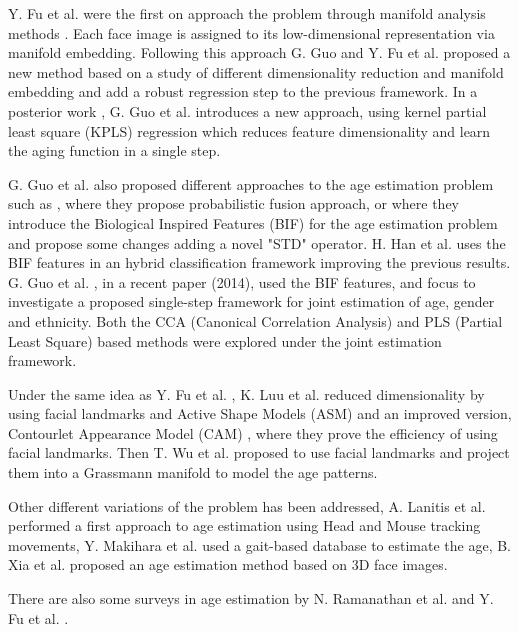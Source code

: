 Y. Fu et al. were the first on approach the problem through manifold analysis methods \cite{4284917, 4523958}. Each face image is assigned to its low-dimensional representation via manifold embedding. Following this approach G. Guo and Y. Fu et al. \cite{4531189} proposed a new method based on a study of different dimensionality reduction and manifold embedding and add a robust regression step to the previous framework. In a posterior work \cite{5995404}, G. Guo et al. introduces a new approach, using kernel partial least square (KPLS) regression which reduces feature dimensionality and learn the aging function in a single step.

G. Guo et al. also proposed different approaches to the age estimation problem such as
\cite{4563041}, where they propose probabilistic fusion approach, or \cite{conf/cvpr/GuoMFH09} where they introduce the Biological Inspired Features (BIF) for the age estimation problem and propose some changes adding a novel "STD" operator. H. Han et al. \cite{han:age} uses the BIF features in an hybrid classification framework improving the previous results. G. Guo et al. \cite{Guo2014761}, in a recent paper (2014), used the BIF features, and focus to investigate a proposed single-step framework for joint estimation of age, gender and ethnicity. Both the CCA (Canonical Correlation Analysis) and PLS (Partial Least Square) based methods were explored under the joint estimation framework.

Under the same idea as Y. Fu et al. \cite{4284917}, K. Luu et al. \cite{Luu:2009:AEU:1736406.1736456, LuuSSBS11} reduced dimensionality by using facial landmarks and Active Shape Models (ASM) \cite{Luu:2009:AEU:1736406.1736456} and an improved version, Contourlet Appearance Model (CAM) \cite{LuuSSBS11}, where they prove the efficiency of using facial landmarks. Then T. Wu et al. \cite{journals/tifs/WuTC12} proposed to use facial landmarks and project them into a Grassmann manifold to model the age patterns.

Other different variations of the problem has been addressed, A. Lanitis et al. \cite{5463396} performed a first approach to age estimation using Head and Mouse tracking movements, Y. Makihara et al. \cite{6117531} used a gait-based database to estimate the age, B. Xia et al. \cite{xia:hal-00904007} proposed an age estimation method based on 3D face images.

There are also some surveys in age estimation by N. Ramanathan et al. \cite{Ramanathan2009131} and Y. Fu et al. \cite{5406526}.

